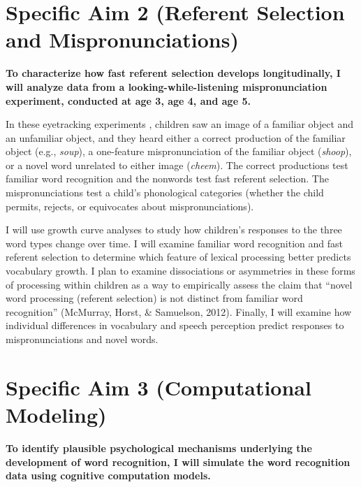 \documentclass[]{book}
\theoremstyle{definition}
\theoremstyle{definition}
\theoremstyle{remark}
\begin{document}
\section{Specific Aim 2 (Referent Selection and
Mispronunciations)}\label{specific-aim-2-referent-selection-and-mispronunciations}

\textbf{To characterize how fast referent selection develops
longitudinally, I will analyze data from a looking-while-listening
mispronunciation experiment, conducted at age 3, age 4, and age 5.}

In these eyetracking experiments \citep[based
on][]{WhiteMorgan2008, MPPaper}, children saw an image of a familiar
object and an unfamiliar object, and they heard either a correct
production of the familiar object (e.g., \emph{soup}), a one-feature
mispronunciation of the familiar object (\emph{shoop}), or a novel word
unrelated to either image (\emph{cheem}). The correct productions test
familiar word recognition and the nonwords test fast referent selection.
The mispronunciations test a child's phonological categories (whether
the child permits, rejects, or equivocates about mispronunciations).

I will use growth curve analyses to study how children's responses to
the three word types change over time. I will examine familiar word
recognition and fast referent selection to determine which feature of
lexical processing better predicts vocabulary growth. I plan to examine
dissociations or asymmetries in these forms of processing within
children as a way to empirically assess the claim that ``novel word
processing (referent selection) is not distinct from familiar word
recognition'' (McMurray, Horst, \& Samuelson, 2012). Finally, I will
examine how individual differences in vocabulary and speech perception
predict responses to mispronunciations and novel words.

\section{Specific Aim 3 (Computational
Modeling)}\label{specific-aim-3-computational-modeling}

\textbf{To identify plausible psychological mechanisms underlying the
development of word recognition, I will simulate the word recognition
data using cognitive computation models.}
\end{document}
